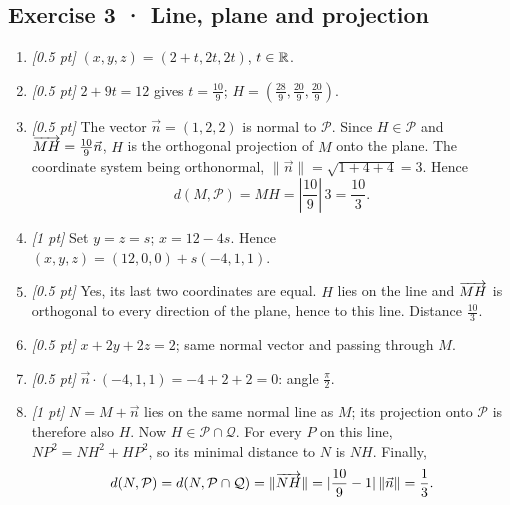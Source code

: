 \subsection*{Exercise 3 · Line, plane and projection}\begin{enumerate}

\item \textit{[0.5 pt]} $(x,y,z)=(2+t,2t,2t)$, $t\in\mathbb R$.

\item \textit{[0.5 pt]} $2+9t=12$ gives $t=\frac{10}{9}$; $H=(\frac{28}{9},\frac{20}{9},\frac{20}{9})$.

\item \textit{[0.5 pt]} The vector $\vec n=(1,2,2)$ is normal to $\mathcal P$. Since $H\in\mathcal P$ and $\overrightarrow{MH}=\frac{10}{9}\vec n$, $H$ is the orthogonal projection of $M$ onto the plane. The coordinate system being orthonormal, $\|\vec n\|=\sqrt{1+4+4}=3$. Hence
\[d(M,\mathcal P)=MH=|\frac{10}{9}|\,3=\frac{10}{3}.\]

\item \textit{[1 pt]} Set $y=z=s$; $x=12-4s$. Hence $(x,y,z)=(12,0,0)+s(-4,1,1)$.

\item \textit{[0.5 pt]} Yes, its last two coordinates are equal. $H$ lies on the line and $\overrightarrow{MH}$ is orthogonal to every direction of the plane, hence to this line. Distance $\frac{10}{3}$.

\item \textit{[0.5 pt]} $x+2y+2z=2$; same normal vector and passing through $M$.

\item \textit{[0.5 pt]} $\vec n\cdot(-4,1,1)=-4+2+2=0$: angle $\frac{\pi}{2}$.

\item \textit{[1 pt]} $N=M+\vec n$ lies on the same normal line as $M$; its projection onto $\mathcal P$ is therefore also $H$. Now $H\in\mathcal P\cap\mathcal Q$. For every $P$ on this line, $NP^2=NH^2+HP^2$, so its minimal distance to $N$ is $NH$. Finally,
\[d(N,\mathcal P)=d(N,\mathcal P\cap\mathcal Q)=\|\overrightarrow{NH}\|=|\frac{10}{9}-1|\,\|\vec n\|=\frac{1}{3}.\]

\end{enumerate}

